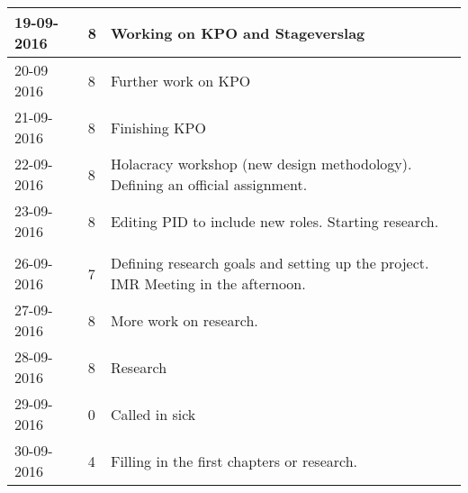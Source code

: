 \begin{tabular}{|p{2cm}|p{1cm}|p{10cm}|}
	\\ \hline
	
	19-09-2016 & 8 & Working on KPO and Stageverslag \\ \hline
	20-09 2016 & 8 & Further work on KPO \\ \hline
	21-09-2016 & 8 & Finishing KPO \\ \hline
	22-09-2016 & 8 & Holacracy workshop (new design methodology). Defining an official assignment. \\ \hline
	23-09-2016 & 8 & Editing PID to include new roles. Starting research. \\ \hline
	
	\\ \hline
	
	26-09-2016 & 7 & Defining research goals and setting up the project. IMR Meeting in the afternoon.\\ \hline
	27-09-2016 & 8 & More work on research. \\ \hline
	28-09-2016 & 8 & Research \\ \hline
	29-09-2016 & 0 & Called in sick \\ \hline
	30-09-2016 & 4 & Filling in the first chapters or research. \\ \hline
\end{tabular}

